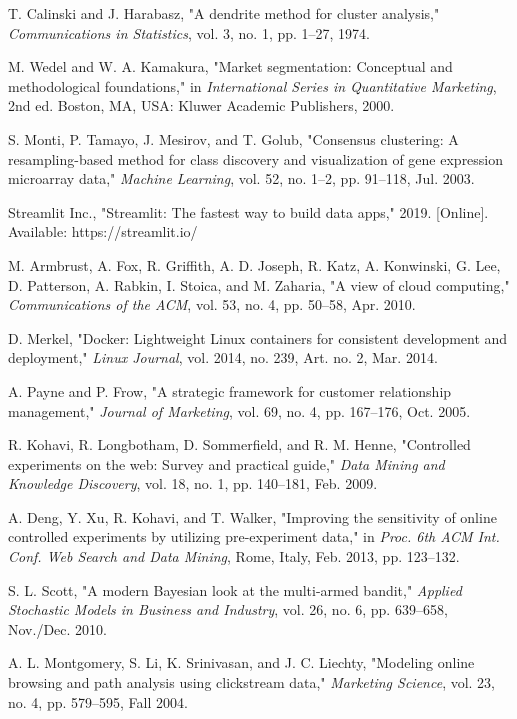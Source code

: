 \documentclass[12pt,a4paper]{report}
\begin{document}
\begin{enumerate}
T. Calinski and J. Harabasz, "A dendrite method for cluster analysis," \textit{Communications in Statistics}, vol. 3, no. 1, pp. 1--27, 1974.

M. Wedel and W. A. Kamakura, "Market segmentation: Conceptual and methodological foundations," in \textit{International Series in Quantitative Marketing}, 2nd ed. Boston, MA, USA: Kluwer Academic Publishers, 2000.

S. Monti, P. Tamayo, J. Mesirov, and T. Golub, "Consensus clustering: A resampling-based method for class discovery and visualization of gene expression microarray data," \textit{Machine Learning}, vol. 52, no. 1--2, pp. 91--118, Jul. 2003.

Streamlit Inc., "Streamlit: The fastest way to build data apps," 2019. [Online]. Available: https://streamlit.io/

M. Armbrust, A. Fox, R. Griffith, A. D. Joseph, R. Katz, A. Konwinski, G. Lee, D. Patterson, A. Rabkin, I. Stoica, and M. Zaharia, "A view of cloud computing," \textit{Communications of the ACM}, vol. 53, no. 4, pp. 50--58, Apr. 2010.

D. Merkel, "Docker: Lightweight Linux containers for consistent development and deployment," \textit{Linux Journal}, vol. 2014, no. 239, Art. no. 2, Mar. 2014.

A. Payne and P. Frow, "A strategic framework for customer relationship management," \textit{Journal of Marketing}, vol. 69, no. 4, pp. 167--176, Oct. 2005.

R. Kohavi, R. Longbotham, D. Sommerfield, and R. M. Henne, "Controlled experiments on the web: Survey and practical guide," \textit{Data Mining and Knowledge Discovery}, vol. 18, no. 1, pp. 140--181, Feb. 2009.

A. Deng, Y. Xu, R. Kohavi, and T. Walker, "Improving the sensitivity of online controlled experiments by utilizing pre-experiment data," in \textit{Proc. 6th ACM Int. Conf. Web Search and Data Mining}, Rome, Italy, Feb. 2013, pp. 123--132.

S. L. Scott, "A modern Bayesian look at the multi-armed bandit," \textit{Applied Stochastic Models in Business and Industry}, vol. 26, no. 6, pp. 639--658, Nov./Dec. 2010.

A. L. Montgomery, S. Li, K. Srinivasan, and J. C. Liechty, "Modeling online browsing and path analysis using clickstream data," \textit{Marketing Science}, vol. 23, no. 4, pp. 579--595, Fall 2004.


\end{enumerate}
\end{document}
